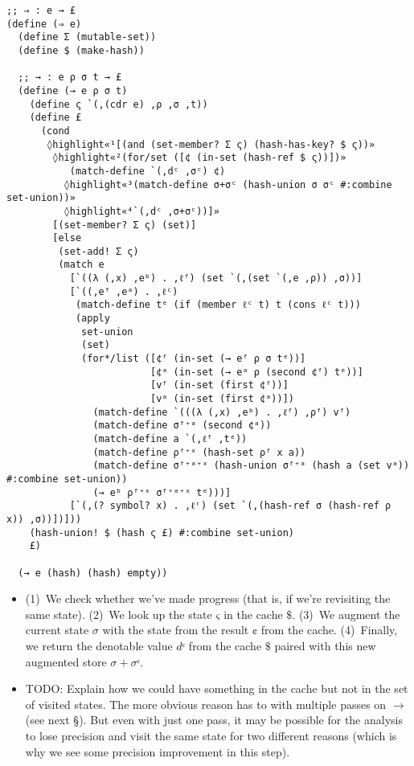 \documentclass[12pt, oneside]{book}
\begin{document}
\begin{Verbatim}
;; ⇒ : e → £
(define (⇒ e)
  (define Σ (mutable-set))
  (define $ (make-hash))

  ;; → : e ρ σ t → £
  (define (→ e ρ σ t)
    (define ς `(,(cdr e) ,ρ ,σ ,t))
    (define £
      (cond
       ◊highlight«¹[(and (set-member? Σ ς) (hash-has-key? $ ς))»
        ◊highlight«²(for/set ([¢ (in-set (hash-ref $ ς))])»
           (match-define `(,dᶜ ,σᶜ) ¢)
          ◊highlight«³(match-define σ+σᶜ (hash-union σ σᶜ #:combine set-union))»
          ◊highlight«⁴`(,dᶜ ,σ+σᶜ))]»
        [(set-member? Σ ς) (set)]
        [else
         (set-add! Σ ς)
         (match e
           [`((λ (,x) ,eᵇ) . ,ℓᶠ) (set `(,(set `(,e ,ρ)) ,σ))]
           [`((,eᶠ ,eᵃ) . ,ℓᶜ)
            (match-define tᵉ (if (member ℓᶜ t) t (cons ℓᶜ t)))
            (apply
             set-union
             (set)
             (for*/list ([¢ᶠ (in-set (→ eᶠ ρ σ tᵉ))]
                         [¢ᵃ (in-set (→ eᵃ ρ (second ¢ᶠ) tᵉ))]
                         [vᶠ (in-set (first ¢ᶠ))]
                         [vᵃ (in-set (first ¢ᵃ))])
               (match-define `(((λ (,x) ,eᵇ) . ,ℓᶠ) ,ρᶠ) vᶠ)
               (match-define σᶠ⁺ᵃ (second ¢ᵃ))
               (match-define a `(,ℓᶠ ,tᵉ))
               (match-define ρᶠ⁺ˣ (hash-set ρᶠ x a))
               (match-define σᶠ⁺ᵃ⁺ˣ (hash-union σᶠ⁺ᵃ (hash a (set vᵃ)) #:combine set-union))
               (→ eᵇ ρᶠ⁺ˣ σᶠ⁺ᵃ⁺ˣ tᵉ)))]
           [`(,(? symbol? x) . ,ℓʳ) (set `(,(hash-ref σ (hash-ref ρ x)) ,σ))])]))
    (hash-union! $ (hash ς £) #:combine set-union)
    £)

  (→ e (hash) (hash) empty))
\end{Verbatim}

\begin{itemize}
  \item (1)~We check whether we’ve made progress (that is, if we’re revisiting the same state). (2)~We look up the state \(ς\) in the cache \(\$\). (3)~We augment the  current state \(σ\) with the state from the result \(¢\) from the cache. (4)~Finally, we return the denotable value \(dᶜ\) from the cache \(\$\) paired with this new augmented store \(σ+σᶜ\).
  \item TODO: Explain how we could have something in the cache but not in the set of visited states. The more obvious reason has to with multiple passes on \(→\) (see next §). But even with just one pass, it may be possible for the analysis to lose precision and visit the same state for two different reasons (which is why we see some precision improvement in this step).
\end{itemize}
\end{document}
